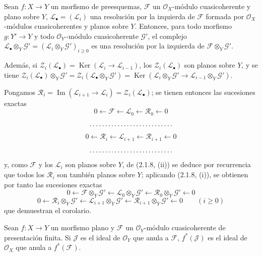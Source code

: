 \begin{corollary}[2.1.10]
\label{IV.2.1.10-fr}
Sean $f:X\to Y$ un morfismo de preesquemas, $\mathscr F$ un
$\mathcal O_X$-módulo cuasicoherente y plano sobre $Y$,
$\mathscr L_\bullet=(\mathscr L_i)$ una resolución por la izquierda de
$\mathscr F$ formada por $\mathcal O_X$-módulos cuasicoherentes y planos sobre
$Y$. Entonces, para todo morfismo $g:Y'\to Y$ y todo
$\mathcal O_{Y'}$-módulo cuasicoherente $\mathscr G'$, el complejo
$\mathscr L_\bullet\otimes_Y\mathscr G'=
(\mathscr L_i\otimes_Y\mathscr G')_{i\geq0}$ es una resolución por la
izquierda de $\mathscr F\otimes_Y\mathscr G'$.

Además, si
$\mathscr Z_i(\mathscr L_\bullet)=\operatorname{Ker}
(\mathscr L_i\to\mathscr L_{i-1})$, los $\mathscr Z_i(\mathscr L_\bullet)$
son planos sobre $Y$, y se tiene
$\mathscr Z_i(\mathscr L_\bullet)\otimes_Y\mathscr G'
=\mathscr Z_i(\mathscr L_\bullet\otimes_Y\mathscr G')
=\operatorname{Ker}(\mathscr L_i\otimes_Y\mathscr G'
\to\mathscr L_{i-1}\otimes_Y\mathscr G')$.
\end{corollary}

Pongamos
$\mathscr R_i=\operatorname{Im}(\mathscr L_{i+1}\to\mathscr L_i)
=\mathscr Z_i(\mathscr L_\bullet)$; se tienen entonces las sucesiones exactas
\[
0\leftarrow\mathscr F\leftarrow\mathscr L_0\leftarrow\mathscr R_0\leftarrow0
\]
\[
\hbox to 12em{\dotfill}
\]
\[
0\leftarrow\mathscr R_i\leftarrow\mathscr L_{i+1}
\leftarrow\mathscr R_{i+1}\leftarrow0
\]
\[
\hbox to 12em{\dotfill}
\]
y, como $\mathscr F$ y los $\mathscr L_i$ son planos sobre $Y$, de
(2.1.8, (ii)) se deduce por recurrencia que todos los $\mathscr R_i$ son
también planos sobre $Y$; aplicando (2.1.8, (i)), se obtienen por tanto las
sucesiones exactas
\[
0\leftarrow\mathscr F\otimes_Y\mathscr G'
\leftarrow\mathscr L_0\otimes_Y\mathscr G'
\leftarrow\mathscr R_0\otimes_Y\mathscr G'\leftarrow0
\]
\[
0\leftarrow\mathscr R_i\otimes_Y\mathscr G'
\leftarrow\mathscr L_{i+1}\otimes_Y\mathscr G'
\leftarrow\mathscr R_{i+1}\otimes_Y\mathscr G'\leftarrow0
\qquad(i\geq0)
\]
que demuestran el corolario.

\begin{proposition}[2.1.11]
\label{IV.2.1.11-fr}
Sean $f:X\to Y$ un morfismo plano y $\mathscr F$ un $\mathcal O_Y$-módulo
cuasicoherente de presentación finita. Si $\mathscr J$ es el ideal de
$\mathcal O_Y$ que anula a $\mathscr F$, $f^*(\mathscr J)$ es el ideal de
$\mathcal O_X$ que anula a $f^*(\mathscr F)$.
\end{proposition}

